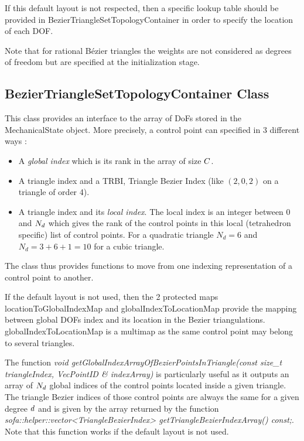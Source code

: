 \documentclass[a4paper,11pt]{article}
\newcommand{\Bezier}{{B{\'e}zier }}
\begin{document}
If this default layout is not respected, then a specific lookup table should be provided in BezierTriangleSetTopologyContainer in order to specify the location of each DOF.

Note that for rational \Bezier triangles the weights are not considered as degrees of freedom but are specified at the initialization stage.

\subsection{BezierTriangleSetTopologyContainer Class}

This class provides an interface to the array of DoFs stored in the MechanicalState object. More precisely, a control point can specified in 3 different ways :

\begin{itemize}
	\item A {\em global index} which is its rank in the array of size ${C}$.
	\item A triangle index and a  TRBI, Triangle  Bezier Index (like $(2,0,2)$ on a triangle of order 4).
	\item A triangle index and its {\em local index}. The local index is an integer between 0 and $N_{d}$ which gives the rank of the control points in this local (tetrahedron specific) list of control points. For a quadratic triangle $N_d=6$ and $N_d=3+6+1=10$ for a cubic triangle.
 \end{itemize}
The class thus provides functions to move from one indexing representation of a control point to another.

If the default layout is not used, then the 2 protected maps locationToGlobalIndexMap and globalIndexToLocationMap provide the mapping between global DOFs index and its location in the Bezier triangulations. globalIndexToLocationMap is a multimap as the same control point may belong to several triangles.

The function {\it void getGlobalIndexArrayOfBezierPointsInTriangle(const size\_t triangleIndex, VecPointID \& indexArray) } is particularly useful as it outputs an array of $N_{d}$ global indices of the control points located inside a given triangle. The triangle  Bezier indices of those control points are always the same for a given degree ${d}$ and is given by the array returned by the function {\it sofa::helper::vector<TriangleBezierIndex> getTriangleBezierIndexArray() const;}. Note that this function works if the default layout is not used. 
\end{document}
